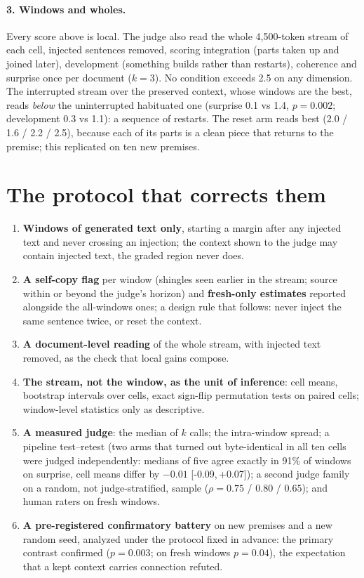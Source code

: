 \documentclass{article}
\newcommand{\ci}[2]{[#1,\,#2]}
\begin{document}
\paragraph{3. Windows and wholes.} Every score above is local. The judge also
read the whole 4{,}500-token stream of each cell, injected sentences removed,
scoring integration (parts taken up and joined later), development (something
builds rather than restarts), coherence and surprise once per document
($k=3$). No condition exceeds 2.5 on any dimension. The interrupted stream
over the preserved context, whose windows are the best, reads \emph{below}
the uninterrupted habituated one (surprise 0.1 vs 1.4, $p=0.002$; development
0.3 vs 1.1): a sequence of restarts. The reset arm reads best (2.0 / 1.6 /
2.2 / 2.5), because each of its parts is a clean piece that returns to the
premise; this replicated on ten new premises.

\section{The protocol that corrects them}

\begin{enumerate}
\item \textbf{Windows of generated text only}, starting a margin after any
injected text and never crossing an injection; the context shown to the judge
may contain injected text, the graded region never does.
\item \textbf{A self-copy flag} per window (shingles seen earlier in the
stream; source within or beyond the judge's horizon) and \textbf{fresh-only
estimates} reported alongside the all-windows ones; a design rule that
follows: never inject the same sentence twice, or reset the context.
\item \textbf{A document-level reading} of the whole stream, with injected
text removed, as the check that local gains compose.
\item \textbf{The stream, not the window, as the unit of inference}: cell
means, bootstrap intervals over cells, exact sign-flip permutation tests on
paired cells; window-level statistics only as descriptive.
\item \textbf{A measured judge}: the median of $k$ calls; the intra-window
spread; a pipeline test--retest (two arms that turned out byte-identical in
all ten cells were judged independently: medians of five agree exactly in
91\% of windows on surprise, cell means differ by $-0.01$
\ci{-0.09}{+0.07}); a second judge family on a random, not judge-stratified,
sample ($\rho=0.75$ / $0.80$ / $0.65$); and human raters on fresh windows.
\item \textbf{A pre-registered confirmatory battery} on new premises and a
new random seed, analyzed under the protocol fixed in advance: the primary
contrast confirmed ($p=0.003$; on fresh windows $p=0.04$), the expectation
that a kept context carries connection refuted.
\end{enumerate}
\end{document}
